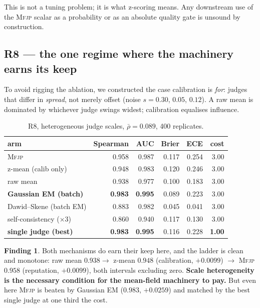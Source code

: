 \documentclass[11pt]{article}
\theoremstyle{definition}
\newtheorem{finding}{Finding}
\newcommand{\rhobar}{\ensuremath{\bar{\rho}}}
\newcommand{\mfjp}{\textsc{Mfjp}}
\begin{document}
This is not a tuning problem; it is what z-scoring means. Any downstream use of the \mfjp{}
scalar as a probability or as an absolute quality gate is unsound by construction.

\subsection{R8 --- the one regime where the machinery earns its keep}

To avoid rigging the ablation, we constructed the case calibration is \emph{for}: judges that
differ in \emph{spread}, not merely offset (noise $s = 0.30$, $0.05$, $0.12$). A raw mean is
dominated by whichever judge swings widest; calibration equalises influence.

\begin{table}[H]\centering
\begin{tabular}{lrrrrr}
\toprule
arm & Spearman & AUC & Brier & ECE & cost \\
\midrule
\mfjp{}                        & 0.958 & 0.987 & 0.117 & 0.254 & 3.00 \\
z-mean (calib only)            & 0.948 & 0.983 & 0.120 & 0.246 & 3.00 \\
raw mean                       & 0.938 & 0.977 & 0.100 & 0.183 & 3.00 \\
\textbf{Gaussian EM (batch)}   & \textbf{0.983} & \textbf{0.995} & 0.089 & 0.223 & 3.00 \\
Dawid--Skene (batch EM)        & 0.883 & 0.982 & 0.045 & 0.041 & 3.00 \\
self-consistency ($\times$3)   & 0.860 & 0.940 & 0.117 & 0.130 & 3.00 \\
\textbf{single judge (best)}   & \textbf{0.983} & \textbf{0.995} & 0.116 & 0.228 & \textbf{1.00} \\
\bottomrule
\end{tabular}
\caption{R8, heterogeneous judge scales, $\rhobar=0.089$, 400 replicates.}
\end{table}

\begin{finding}
Both mechanisms do earn their keep here, and the ladder is clean and monotone:
raw mean $0.938 \to$ z-mean $0.948$ (calibration, $+0.0099$) $\to$ \mfjp{} $0.958$
(reputation, $+0.0099$), both intervals excluding zero. \textbf{Scale heterogeneity is the
necessary condition for the mean-field machinery to pay.} But even here \mfjp{} is beaten by
Gaussian EM ($0.983$, $+0.0259$) and matched by the best single judge at one third the cost.
\end{finding}
\end{document}
